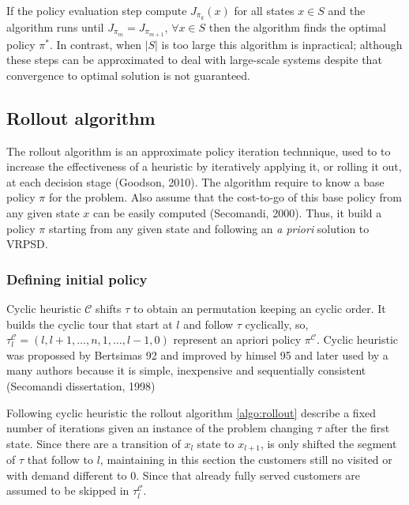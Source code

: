 If the policy evaluation step compute $J_{\pi_k}(x)$ for all states $x \in S$ and the algorithm runs until  $J_{\pi_m} = J_{\pi_{m+1}}$, $\forall x \in S$ then the algorithm finds the optimal policy $\pi^*$. In contrast, when $|S|$ is too large this algorithm is inpractical; although these steps can be approximated to deal with large-scale systems despite that convergence to optimal solution is not guaranteed.


\subsection{Rollout algorithm}

The rollout algorithm is an approximate policy iteration technnique, used to to increase the effectiveness of a heuristic by iteratively applying it, or rolling it out, at each decision stage (Goodson, 2010). The algorithm require to know a base policy $\pi$ for the problem. Also assume that the cost-to-go of this base policy from any given state $x$ can be easily computed (Secomandi, 2000). Thus, it build a policy $\pi$ starting from any given state and following an \textit{a priori} solution to VRPSD.


\subsubsection{Defining initial policy}\label{sec:initial_policy}


Cyclic heuristic $\mathcal{C}$ shifts $\tau$ to obtain an permutation keeping an cyclic order. It builds the cyclic tour that start at $l$ and follow $\tau$ cyclically, so, $\tau^\mathcal{C}_l = (l, l+1, \ldots , n , 1 , \ldots , l-1, 0)$ represent an apriori policy $\pi^\mathcal{C}$. Cyclic heuristic was propossed by Bertsimas 92  and improved by himsel 95 and later used by a many authors because it is simple, inexpensive and sequentially consistent (Secomandi dissertation, 1998)

Following cyclic heuristic the rollout algorithm \ref{algo:rollout} describe a fixed number of iterations given an instance of the problem changing $\tau$ after the first state. Since there are a transition of $x_l$ state to $x_{l+1}$, is only shifted the segment of $\tau$ that follow to $l$, maintaining in this section the customers still no visited or with demand different to $0$. Since that already fully served customers are assumed to be skipped in $\tau^\mathcal{C}_l$.

